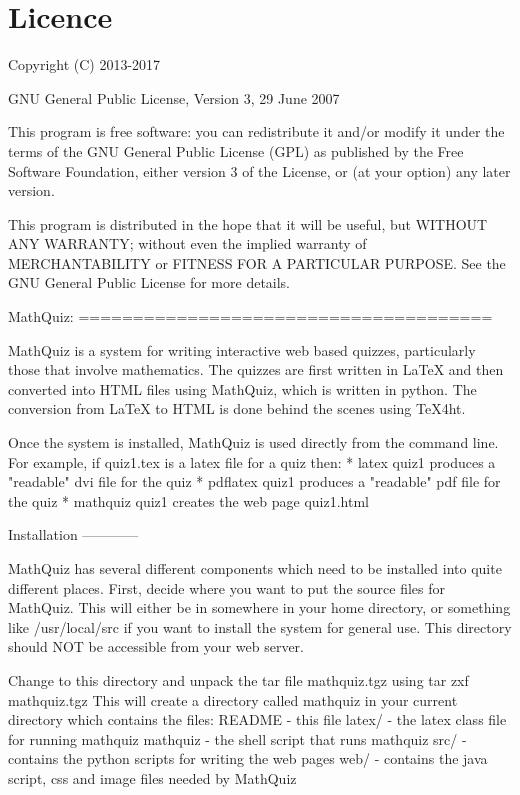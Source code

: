 \documentclass[svgnames]{article}
\begin{document}
\section{Licence}

Copyright (C) 2013-2017

GNU General Public License, Version 3, 29 June 2007

This program is free software: you can redistribute it and/or modify it under
the terms of the GNU General Public License (GPL) as published by the Free
Software Foundation, either version 3 of the License, or (at your option) any
later version.

This program is distributed in the hope that it will be useful, but WITHOUT ANY
WARRANTY; without even the implied warranty of MERCHANTABILITY or FITNESS FOR A
PARTICULAR PURPOSE.  See the GNU General Public License for more details.



MathQuiz:
======================================

MathQuiz is a system for writing interactive web based quizzes, particularly
those that involve mathematics. The quizzes are first written in LaTeX and
then converted into HTML files using MathQuiz, which is written in python. The
conversion from LaTeX to HTML is done behind the scenes using TeX4ht.

Once the system is installed, MathQuiz is used directly from the
command line. For example, if quiz1.tex is a latex file for a quiz then:
    * latex quiz1         produces a "readable" dvi file for the quiz
    * pdflatex quiz1      produces a "readable" pdf file for the quiz
    * mathquiz quiz1      creates the web page quiz1.html


Installation
------------

MathQuiz has several different components which need to be installed into quite
different places. First, decide where you want to put the source files for MathQuiz.
This will either be in somewhere in your home directory, or something like
/usr/local/src if you want to install the system for general use. This directory
should NOT be accessible from your web server.

Change to this directory and unpack the tar file mathquiz.tgz using
    tar zxf mathquiz.tgz
This will create a directory called mathquiz in your current directory which contains
the files:
    README    -  this file
    latex/    -  the latex class file for running mathquiz
    mathquiz  -  the shell script that runs mathquiz
    src/      -  contains the python scripts for writing the web pages
    web/      -  contains the java script, css and image files needed by MathQuiz
\end{document}

